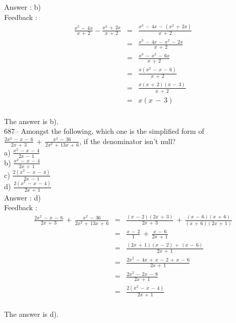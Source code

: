 \documentclass[letterpaper, 12pt]{article}
\begin{document}
Answer : b)\\

Feedback : \\
\begin{eqnarray*}
\frac{x^{3}\,-\,4x}{x\,+\,2}-\frac{x^{2}\,+\,2x}{x\,+\,2}&=&\frac{x^{3}\,-\,4x\,-\,(x^{2}\,+\,2x)}{x\,+\,2}\\[2mm]
&=&\frac{x^{3}\,-\,4x\,-\,x^{2}\,-\,2x}{x\,+\,2}\\[2mm]
&=&\frac{x^{3}\,-\,x^{2}\,-\,6x}{x\,+\,2}\\[2mm]
&=&\frac{x(x^{2}\,-\,x\,-\,6)}{x\,+\,2}\\[2mm]
&=&\frac{x(x\,+\,2)(x\,-\,3)}{x\,+\,2}\\[2mm]
&=&x(x\,-\,3)\\
\end{eqnarray*}

The answer is b).\\

687-- Amongst the following, which one is the simplified form of $\frac{2x^{2}\,-\,x\,-\,6}{2x\,+\,3}\,+\,\frac{x^{2}\,-\,36}{2x^{2}\,+\,13x\,+\,6}$,
if the denominator isn't null?\\
a) $\frac{x^{2}\,-\,x\,-\,4}{2x\,-\,1}$\\[2mm]
b) $\frac{x^{2}\,-\,x\,-\,4}{2x\,+\,1}$\\[2mm]
c) $\frac{2(x^{2}\,-\,x\,-\,4)}{2x\,-\,1}$\\[2mm]
d) $\frac{2(x^{2}\,-\,x\,-\,4)}{2x\,+\,1}$\\[2mm]

Answer : d)\\

Feedback : \\
\begin{eqnarray*}
\frac{2x^{2}\,-\,x\,-\,6}{2x\,+\,3}\,+\,\frac{x^{2}\,-\,36}{2x^{2}\,+\,13x\,+\,6}&=&\frac{(x\,-\,2)(2x\,+\,3)}{2x\,+\,3}\,+\,\frac{(x\,-\,6)(x\,+\,6)}{(x\,+\,6)(2x\,+\,1)}\\[2mm]
&=&\frac{x\,-\,2}{1}\,+\,\frac{x\,-\,6}{2x\,+\,1}\\[2mm]
&=&\frac{(2x\,+\,1)(x\,-\,2)\,+\,(x\,-\,6)}{2x\,+\,1}\\[2mm]
&=&\frac{2x^{2}\,-\,4x\,+\,x\,-\,2\,+\,x\,-\,6}{2x\,+\,1}\\[2mm]
&=&\frac{2x^{2}\,-\,2x\,-\,8}{2x\,+\,1}\\[2mm]
&=&\frac{2(x^{2}\,-\,x\,-\,4)}{2x\,+\,1}\\
\end{eqnarray*}

The answer is d).\\
\end{document}
